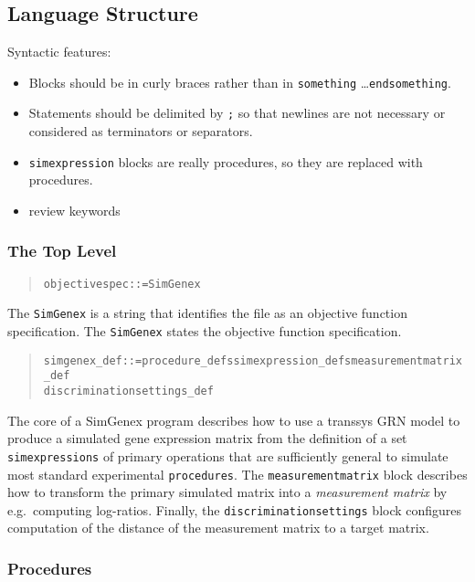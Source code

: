 \documentclass[a4paper,fleqn]{article}
\newcommand{\computercode}[1]{\texttt{#1}}
\newcommand{\newterm}[1]{\emph{#1}}
\newenvironment{ebnfrule}{\begin{footnotesize}\begin{quote}\begin{alltt}}{\end{alltt}\end{quote}\end{footnotesize}}
\begin{document}
\subsection{Language Structure}

Syntactic features:

\begin{itemize}
\item Blocks should be in curly braces rather than in
  \computercode{something} \ldots \computercode{endsomething}.
\item Statements should be delimited by \computercode{;} so that
  newlines are not necessary or considered as terminators or
  separators.
\item \computercode{simexpression} blocks are really procedures, so
  they are replaced with procedures.
\item review keywords
\end{itemize}

\subsubsection{The Top Level}

\begin{ebnfrule}
objectivespec ::= SimGenex
\end{ebnfrule}
The \computercode{SimGenex} is a string that
identifies the file as an objective function specification. The
\computercode{SimGenex} states the
objective function specification.

\begin{ebnfrule}
simgenex_def ::= procedure_defs simexpression_defs measurementmatrix_def 
discriminationsettings_def \end{ebnfrule}

The core of a SimGenex program describes how to use a transsys GRN
model to produce a simulated gene expression matrix from the  
definition of a set \computercode{simexpressions} of primary operations
that are sufficiently general to simulate most standard experimental 
\computercode{procedures}. The \computercode{measurementmatrix} 
block describes how to transform the primary simulated matrix into a 
\newterm{measurement matrix} by e.g.\ computing log-ratios. Finally, the 
\computercode{discriminationsettings} block configures computation of the 
distance of the measurement matrix to a target matrix.

\subsubsection{Procedures}
\label{section_procedures}
\end{document}
